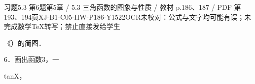 \begin{bankitem}{习题5.3 第6题}{第5章 / 5.3 三角函数的图象与性质 / 教材 p.186、187 / PDF 第193、194页}{XJ-B1-C05-HW-P186-Y1522}{OCR未校对：公式与文字均可能有误；未完成数学TeX转写；禁止直接发给学生}
\begin{ocrdraft}
\par
《）的简图．
\par
6．画出函数3，一
\par
{}tanX，
\par
[教材p.187 / PDF第194页]
\end{ocrdraft}
\end{bankitem}
